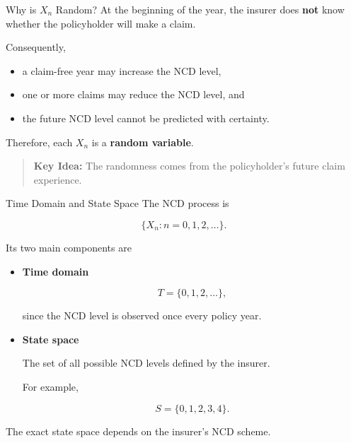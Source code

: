 \documentclass[
  ignorenonframetext,
  aspectratio=169,
]{beamer}
\providecommand{\tightlist}{%
  \setlength{\itemsep}{0pt}\setlength{\parskip}{0pt}}
\begin{document}
\begin{frame}{Why is \(X_n\) Random?}
\protect{}\label{why-is-x_n-random}
At the beginning of the year, the insurer does \textbf{not} know whether
the policyholder will make a claim.

Consequently,

\begin{itemize}
\tightlist
\item
  a claim-free year may increase the NCD level,
\item
  one or more claims may reduce the NCD level, and
\item
  the future NCD level cannot be predicted with certainty.
\end{itemize}

Therefore, each \(X_n\) is a \textbf{random variable}.

\begin{quote}
\textbf{Key Idea:} The randomness comes from the policyholder's future
claim experience.
\end{quote}
\end{frame}

\begin{frame}{Time Domain and State Space}
\protect{}\label{time-domain-and-state-space}
The NCD process is

\[
\{X_n:n=0,1,2,\ldots\}.
\]

Its two main components are

\begin{itemize}
\item
  \textbf{Time domain}

  \[
  T=\{0,1,2,\ldots\},
  \]

  since the NCD level is observed once every policy year.
\item
  \textbf{State space}

  The set of all possible NCD levels defined by the insurer.

  For example,

  \[
  S=\{0,1,2,3,4\}.
  \]
\end{itemize}

The exact state space depends on the insurer's NCD scheme.
\end{frame}
\end{document}
